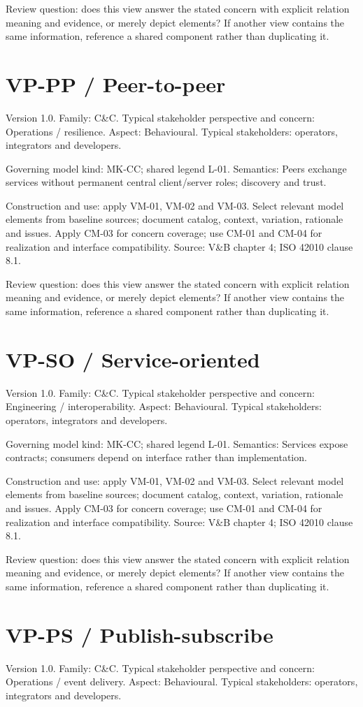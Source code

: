 \documentclass[11pt,letterpaper]{article}
\newcommand{\docsection}[1]{\Needspace{5\baselineskip}\section{#1}}
\begin{document}
Review question: does this view answer the stated concern with explicit relation meaning and evidence, or merely depict elements? If another view contains the same information, reference a shared component rather than duplicating it.

\docsection{VP-PP / Peer-to-peer}
Version 1.0. Family: C\&C. Typical stakeholder perspective and concern: Operations / resilience. Aspect: Behavioural. Typical stakeholders: operators, integrators and developers.

Governing model kind: MK-CC; shared legend L-01. Semantics: Peers exchange services without permanent central client/server roles; discovery and trust.

Construction and use: apply VM-01, VM-02 and VM-03. Select relevant model elements from baseline sources; document catalog, context, variation, rationale and issues. Apply CM-03 for concern coverage; use CM-01 and CM-04 for realization and interface compatibility. Source: V\&B chapter 4; ISO 42010 clause 8.1.

Review question: does this view answer the stated concern with explicit relation meaning and evidence, or merely depict elements? If another view contains the same information, reference a shared component rather than duplicating it.

\docsection{VP-SO / Service-oriented}
Version 1.0. Family: C\&C. Typical stakeholder perspective and concern: Engineering / interoperability. Aspect: Behavioural. Typical stakeholders: operators, integrators and developers.

Governing model kind: MK-CC; shared legend L-01. Semantics: Services expose contracts; consumers depend on interface rather than implementation.

Construction and use: apply VM-01, VM-02 and VM-03. Select relevant model elements from baseline sources; document catalog, context, variation, rationale and issues. Apply CM-03 for concern coverage; use CM-01 and CM-04 for realization and interface compatibility. Source: V\&B chapter 4; ISO 42010 clause 8.1.

Review question: does this view answer the stated concern with explicit relation meaning and evidence, or merely depict elements? If another view contains the same information, reference a shared component rather than duplicating it.

\docsection{VP-PS / Publish-subscribe}
Version 1.0. Family: C\&C. Typical stakeholder perspective and concern: Operations / event delivery. Aspect: Behavioural. Typical stakeholders: operators, integrators and developers.
\end{document}
